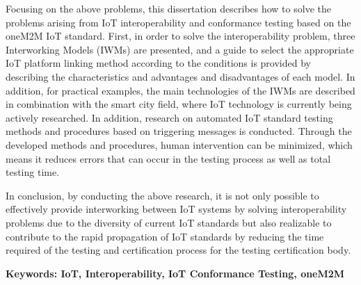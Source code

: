 Focusing on the above problems, this dissertation describes how to solve the problems arising from IoT interoperability and conformance testing based on the oneM2M IoT standard. First, in order to solve the interoperability problem, three Interworking Models (IWMs) are presented, and a guide to select the appropriate IoT platform linking method according to the conditions is provided by describing the characteristics and advantages and disadvantages of each model. In addition, for practical examples, the main technologies of the IWMs are described in combination with the smart city field, where IoT technology is currently being actively researched. In addition, research on automated IoT standard testing methods and procedures based on triggering messages is conducted. Through the developed methods and procedures, human intervention can be minimized, which means it reduces errors that can occur in the testing process as well as total testing time.

In conclusion, by conducting the above research, it is not only possible to effectively provide interworking between IoT systems by solving interoperability problems due to the diversity of current IoT standards but also realizable to contribute to the rapid propagation of IoT standards by reducing the time required of the testing and certification process for the testing certification body.

\begin{flushleft}
\textbf{Keywords: IoT, Interoperability, IoT Conformance Testing, oneM2M}
\end{flushleft}

\clearpage
